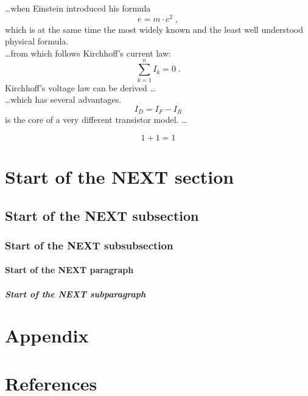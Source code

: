 \documentclass[11pt, oneside]{article}   	%
\begin{document}
\newpage

     \ldots when Einstein introduced his formula
     \begin{equation}
e = m \cdot c^2 \; ,
\end{equation}
which is at the same time the most widely known and the least well understood physical formula.\\

     \ldots from which follows Kirchhoff's current law:
     \begin{equation}
\sum_{k=1}^{n} I_k = 0 \; . \end{equation}
     Kirchhoff's voltage law can be derived \ldots\\

\ldots which has several advantages.
\begin{equation} I_D = I_F - I_R
\end{equation}
is the core of a very different transistor model. \ldots

\begin{equation}1+1 = 1\end{equation}

\section{Start of the NEXT section}
\subsection{Start of the NEXT subsection}
\subsubsection{Start of the NEXT subsubsection}
\paragraph{Start of the NEXT paragraph}
\subparagraph{Start of the NEXT subparagraph}

\section*{Appendix}
 
\section{References}
\end{document}
